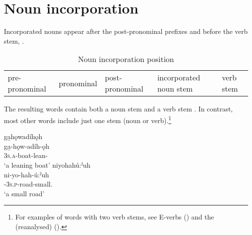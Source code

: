 \chapter{Noun incorporation} \label{ch:Noun Incorporation}
Incorporated nouns appear after the post-pronominal prefixes and before the verb stem, .
 		
\begin{table} [H]
\caption{Noun incorporation position\label{figtab:1:incnounposition}}
\begin{tabularx}{\textwidth}{@{}l|l|l|Q|l@{}}
pre-pro\-nom\-i\-nal & pronominal & post-pro\-nom\-i\-nal & incorporated noun stem & verb stem\\
\end{tabularx}
\end{table}


The resulting words contain both a noun stem and a verb stem . In contrast, most other words include just one stem (noun or verb).\footnote{For examples of words with two verb stems, see E-verbs () and the (reanalysed)  \textsc{\eventuative} ().}

\ea\label{ex:nounincex}
\ea ga̱hǫwadíhǫh\\
\gll ga̱-hǫw-adíh-ǫh\\
 \textsc{3s.a}-boat-lean-{\stative}\\
\glt `a leaning boat'
\ex niyohahú:ˀuh\\
\gll ni-yo-hah-ú:ˀuh\\
 {\partitive}-\textsc{3s.p}-road-small.{\stative}\\
\glt `a small road'
\z
\z


